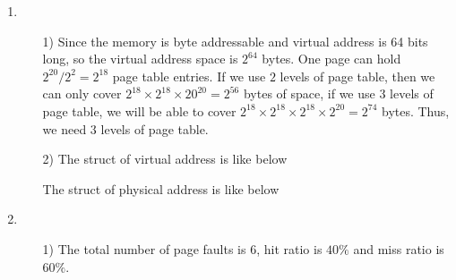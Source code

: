 \documentclass[12pt,a4paper]{article}
\begin{document}
\begin{enumerate}
\begin{enumerate}
			\end{enumerate}
		\item 
			\begin{enumerate}
				\item[1)] Since the	memory is byte addressable and virtual address is 64 bits long, so the virtual address space is $2^{64}$ bytes. One page can hold $2^{20}/2^{2} = 2^{18}$ page table entries. If we use $2$ levels of page table, then we can only cover $2^{18} \times 2^{18} \times 20^{20} = 2^{56}$ bytes of space, if we use $3$ levels of page table, we will be able to cover $2^{18} \times 2^{18} \times 2^{18} \times 2^{20} = 2^{74}$ bytes. Thus, we need $3$ levels of page table.
				
				\item[2)] The struct of virtual address is like below \\
					The struct of physical address is like below \\
			\end{enumerate}
		
		\item 
			\begin{enumerate}
				\item[1)] The total number of page faults is $6$, hit ratio is $40\%$ and miss ratio is $60\%$.
				

\end{enumerate}
\end{enumerate}
\end{document}
